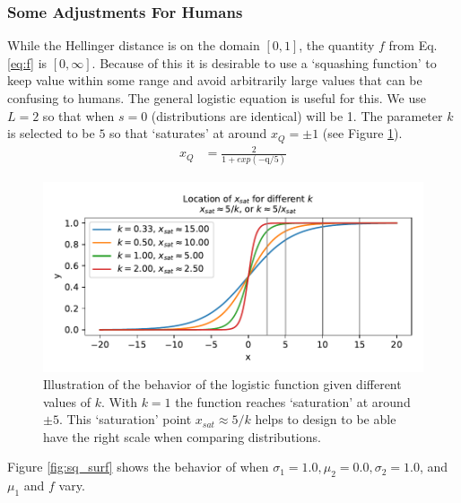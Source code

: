 \subsubsection{Some Adjustments For Humans}
While the Hellinger distance is on the domain $[0,1]$, the quantity $f$ from Eq. \ref{eq:f} is $[0,\infty]$. Because of this it is desirable to use a `squashing function' to keep \xQ{} value within some range and avoid arbitrarily large values that can be confusing to humans. The general logistic equation is useful for this.
We use $L=2$ so that when $s=0$ (distributions are identical) \xQ{} will be 1. The parameter $k$ is selected to be $5$ so that \xQ{} `saturates' at around $x_Q=\pm1$ (see Figure \ref{fig:log_sat}).
\begin{align}
    x_{Q} &= \frac{2}{1+exp(-\text{q}/5)}\label{eq:SQ}
\end{align}
\begin{figure}[tbp]
    \centering
    \includegraphics[width=0.9\linewidth]{Figures/logistic_saturation}
    \caption{Illustration of the behavior of the logistic function given different values of $k$. With $k=1$ the function reaches `saturation' at around $\pm5$. This `saturation' point $x_{sat}\approx 5/k$ helps to design \xQ{} to be able have the right scale when comparing distributions.}
    \label{fig:log_sat}
\end{figure}

Figure \ref{fig:sq_surf} shows the behavior of \xQ{} when $\sigma_1=1.0,\mu_2=0.0,\sigma_2=1.0$, and $\mu_1$ and $f$ vary.

